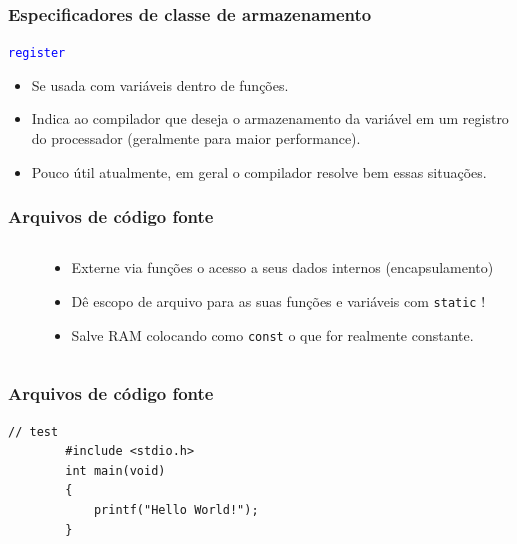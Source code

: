 \documentclass{beamer}
\begin{document}
\begin{frame}
	\frametitle{Especificadores de classe de armazenamento}
	\begin{center}
		\texttt{\textcolor{blue}{register}}
	\end{center}
	\vspace*{0.5cm}
	\begin{itemize}
		\item Se usada com variáveis dentro de funções.
		\item Indica ao compilador que deseja o armazenamento da variável em um registro do processador (geralmente para maior performance).
		\item Pouco útil atualmente, em geral o compilador resolve bem essas situações.
	\end{itemize}
\end{frame}

\begin{frame}
	\frametitle{Arquivos de código fonte}
	\begin{columns}[T] %
		\begin{column}{.60\textwidth}
			
		\end{column}%
		\hfill%
		\begin{column}{.40\textwidth}
			\begin{itemize}
				\item Externe via funções o acesso a seus dados internos (encapsulamento)
				\item Dê escopo de arquivo para as suas funções e variáveis com \texttt{static} !
				\item Salve RAM colocando como \texttt{const} o que for realmente constante.
			\end{itemize}
		\end{column}%
	\end{columns}
\end{frame}

\begin{frame}
	\frametitle{Arquivos de código fonte}
	
\end{frame}


\begin{frame}[fragile]
	\begin{lstlisting}[style=customc]
		// test
		#include <stdio.h>
		int main(void)
		{
			printf("Hello World!"); 
		}
	\end{lstlisting}
\end{frame}
\end{document}

